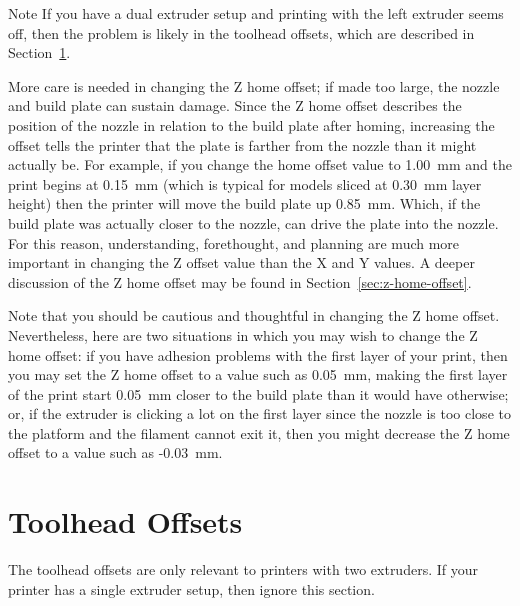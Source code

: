 \begin{bclogo}[logo=\bcinfo, noborder=true, couleurBarre=yellow]{Note}
If you have a dual extruder setup and printing with the left extruder seems off, then the problem is likely in the toolhead offsets, which are described in Section~\ref{sec:toolheadoffsets}.
\end{bclogo}

More care is needed in changing the Z home offset; if made too large, the nozzle and build plate can sustain damage.  Since the Z home offset describes the position of the nozzle in relation to the build plate after homing, increasing the offset tells the printer that the plate is farther from the nozzle than it might actually be.  For example, if you change the home offset value to 1.00~mm and the print begins at 0.15~mm (which is typical for models sliced at 0.30~mm layer height) then the printer will move the build plate up 0.85~mm.  Which, if the build plate was actually closer to the nozzle, can drive the plate into the nozzle.  For this reason, understanding, forethought, and planning are much more important in changing the Z offset value than the X and Y values.  A deeper discussion of the Z home offset may be found in Section~\ref{sec:z-home-offset}.

Note that you should be cautious and thoughtful in changing the Z home offset.  Nevertheless, here are two situations in which you may wish to change the Z home offset: if you have adhesion problems with the first layer of your print, then you may set the Z home offset to a value such as 0.05~mm, making the first layer of the print start 0.05~mm closer to the build plate than it would have otherwise; or, if the extruder is clicking a lot on the first layer since the nozzle is too close to the platform and the filament cannot exit it, then you might decrease the Z home offset to a value such as -0.03~mm.


\section{Toolhead Offsets} \label{sec:toolheadoffsets}

The \glspl{toolhead offset} are only relevant to printers with two extruders.  If your printer has a single extruder setup, then ignore this section.

